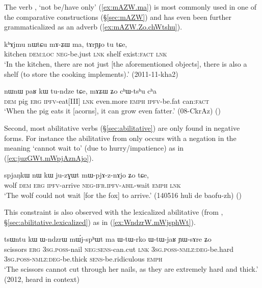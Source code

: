 The verb , `not be/have only' (\ref{ex:mAZW.ma}) is most commonly used in one of the comparative constructions  (§\ref{sec:mAZW}) and has even been further grammaticalized as an adverb  (\ref{ex:mAZW.Zo.chWtshu}).

\begin{exe}
	\ex \label{ex:mAZW.ma}
	\gll kʰɤjmu nɯtɕu mɤ-ʑɯ ma, tɤrɲɟo tu tɕe, \\
	kitchen \textsc{dem}:\textsc{loc} \textsc{neg}-be.just \textsc{lnk} shelf exist:\textsc{fact} \textsc{lnk} \\
	\glt `In the kitchen, there are not just [the aforementioned objects], there is also a shelf (to store the cooking implements).' (2011-11-kha2)
\end{exe}

\begin{exe}
	\ex \label{ex:mAZW.Zo.chWtshu}
	\gll nɯnɯ paʁ kɯ tu-ndze tɕe, mɤʑɯ ʑo cʰɯ-tsʰu cʰa \\
	\textsc{dem} pig \textsc{erg} \textsc{ipfv}-eat[III] \textsc{lnk} even.more \textsc{emph} \textsc{ipfv}-be.fat can:\textsc{fact} \\
	\glt `When the pig eats it [acorns], it can grow even fatter.' (08-CkrAz)
()
\end{exe}

Second, most  abilitative verbs (§\ref{sec:abilitative}) are only found in negative forms. For instance the abilitative  from  only occurs with a negation in the meaning `cannot wait to' (due to hurry/impatience) as in (\ref{ex:juzGWt.mWpjAznAjo}).

\begin{exe}
	\ex \label{ex:juzGWt.mWpjAznAjo}
	\gll  spjaŋkɯ nɯ kɯ ju-zɣɯt mɯ-pjɤ-z-nɤjo ʑo tɕe, \\
	wolf \textsc{dem} \textsc{erg} \textsc{ipfv}-arrive \textsc{neg}-\textsc{ifr}.\textsc{ipfv}-\textsc{abil}-wait \textsc{emph} \textsc{lnk} \\
	\glt `The wolf could not wait [for the fox] to arrive.' (140516 huli de baofu-zh) ()
\end{exe}

This constraint is also observed with the lexicalized abilitative  (from , §\ref {sec:abilitative.lexicalized}) as in (\ref{ex:WndzrW.mWjsphWt}).

\begin{exe}
	\ex \label{ex:WndzrW.mWjsphWt}
	\gll tsɯntu kɯ ɯ-ndzrɯ mɯ́j-spʰɯt ma ɯ-tɯ-rko ɯ-tɯ-jaʁ ɲɯ-sɤre ʑo \\
	scissors \textsc{erg} \textsc{3sg}.\textsc{poss}-nail \textsc{neg}:\textsc{sens}-can.cut \textsc{lnk} \textsc{3sg}.\textsc{poss}-\textsc{nmlz}:\textsc{deg}-be.hard \textsc{3sg}.\textsc{poss}-\textsc{nmlz}:\textsc{deg}-be.thick \textsc{sens}-be.ridiculous \textsc{emph} \\
	\glt `The scissors cannot cut through her nails, as they are extremely hard and thick.' (2012, heard in context) 
\end{exe}



